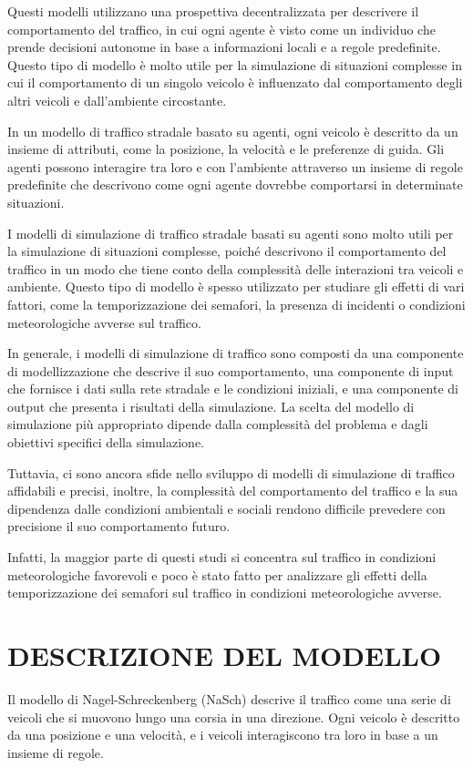 \documentclass[11pt]{article}
\begin{document}
Questi modelli utilizzano una prospettiva decentralizzata per descrivere il comportamento del traffico, in cui ogni agente è visto come un individuo che prende decisioni autonome in base a informazioni locali e a regole predefinite. Questo tipo di modello è molto utile per la simulazione di situazioni complesse in cui il comportamento di un singolo veicolo è influenzato dal comportamento degli altri veicoli e dall'ambiente circostante.

In un modello di traffico stradale basato su agenti, ogni veicolo è descritto da un insieme di attributi, come la posizione, la velocità e le preferenze di guida. Gli agenti possono interagire tra loro e con l'ambiente attraverso un insieme di regole predefinite che descrivono come ogni agente dovrebbe comportarsi in determinate situazioni.

I modelli di simulazione di traffico stradale basati su agenti sono molto utili per la simulazione di situazioni complesse, poiché descrivono il comportamento del traffico in un modo che tiene conto della complessità delle interazioni tra veicoli e ambiente. Questo tipo di modello è spesso utilizzato per studiare gli effetti di vari fattori, come la temporizzazione dei semafori, la presenza di incidenti o condizioni meteorologiche avverse sul traffico.

In generale, i modelli di simulazione di traffico sono composti da una componente di modellizzazione che descrive il suo comportamento, una componente di input che fornisce i dati sulla rete stradale e le condizioni iniziali, e una componente di output che presenta i risultati della simulazione. La scelta del modello di simulazione più appropriato dipende dalla complessità del problema e dagli obiettivi specifici della simulazione.

Tuttavia, ci sono ancora sfide nello sviluppo di modelli di simulazione di traffico affidabili e precisi, inoltre, la complessità del comportamento del traffico e la sua dipendenza dalle condizioni ambientali e sociali rendono difficile prevedere con precisione il suo comportamento futuro.

Infatti, la maggior parte di questi studi si concentra sul traffico in condizioni meteorologiche favorevoli e poco è stato fatto per analizzare gli effetti della temporizzazione dei semafori sul traffico in condizioni meteorologiche avverse.

\section{DESCRIZIONE DEL MODELLO}
Il modello di Nagel-Schreckenberg (NaSch) descrive il traffico come una serie di veicoli che si muovono lungo una corsia in una direzione. Ogni veicolo è descritto da una posizione e una velocità, e i veicoli interagiscono tra loro in base a un insieme di regole.
\end{document}
